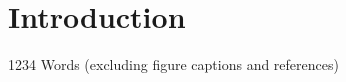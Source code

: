 \documentclass{physics_article_B}
\author{Oliver Dudgeon \and Adam Shaw \and Joseph Parker}
\date{\today}
\begin{document}
\maketitle

\begin{abstract}

\end{abstract}

\section{Introduction}



\newpage
\printbibliography

1234 Words (excluding figure captions and references)
\end{document}
